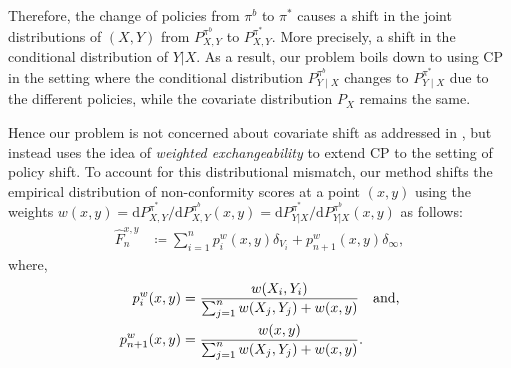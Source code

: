 Therefore, the change of policies from $\pi^b$ to $\pi^*$ causes a shift in the joint distributions of $(X, Y)$ from $P^{\pi^{b}}_{X, Y}$ to $P^{\pi^*}_{X, Y}$. More precisely, a shift in the conditional distribution of $Y|X$. As a result, our problem boils down to using CP in the setting where the conditional distribution $P^{\pi^{b}}_{Y\mid X}$ changes to $P^{\pi^{*}}_{Y \mid X}$ due to the different policies, while the covariate distribution $P_X$ remains the same. 

Hence our problem is not concerned about covariate shift as addressed in \cite{tibshirani2020conformal}, but instead uses the idea of \textit{weighted exchangeability} to extend CP to the setting of policy shift. To account for this distributional mismatch, our method shifts the empirical distribution of non-conformity scores at a point $(x, y)$ using the weights $w(x,y) = \mathrm{d}P^{\pi^{*}}_{X,Y}/\mathrm{d}P^{\pi^{b}}_{X,Y}(x,y) = \mathrm{d}P^{\pi^{*}}_{Y|X}/\mathrm{d}P^{\pi^{b}}_{Y|X}(x,y)$ as follows:
\begin{align}
   \textstyle  \hat{F}_{n}^{x, y} &\coloneqq \sum_{i=1}^n p_i^w(x, y)\delta_{V_i} + p_{n+1}^w(x,y)\delta_\infty, \label{score-dist-pshift}
\end{align}
where,
\begin{align*}
p_i^{w}(x, y) &= \frac{w(X_i, Y_i)}{\sum_{j=1}^n w(X_j, Y_j) + w(x, y)} \quad \textup{and,} \\
p_{n+1}^{w}(x, y) &= \frac{w(x, y)}{\sum_{j=1}^n w(X_j, Y_j) + w(x, y)}. 
\end{align*}


